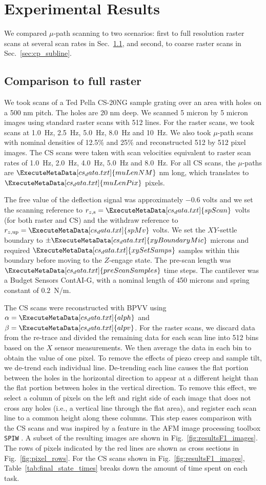 \documentclass[journal]{IEEEtran}
\newcommand{\xc}{\ensuremath{X}\xspace}
\newcommand{\rzup}{\ensuremath{r_{z,\textrm{up}}}\xspace}
\newcommand{\rzs}{\ensuremath{r_{z,\textrm{s}}}\xspace}
\newcommand{\scanD}[1]{\ExecuteMetaData[cs_data.txt]{#1}}
\begin{document}
\section{Experimental Results}\label{sec:results}
We compared $\mu$-path scanning to two scenarios: first to full resolution raster scans at several scan rates in
Sec.~\ref{sec:cp_full}, and second, to coarse raster scans in
Sec.~\ref{sec:cp_subline}.

\subsection{Comparison to full raster}\label{sec:cp_full}
We took scans of a Ted Pella CS-20NG sample grating over an area with
holes on a 500 nm pitch. The holes are 20 nm deep. We scanned 5 micron
by 5 micron images using standard raster scans with 512 lines. For the
raster scans, we took scans at 1.0~Hz, 2.5~Hz, 5.0~Hz, 8.0~Hz and
10~Hz. We also took $\mu$-path scans with nominal densities of 12.5\% and
25\% and reconstructed 512 by 512 pixel images. The CS scans were
taken with scan velocities equivalent to raster scan rates of 1.0~Hz,
2.0~Hz, 4.0~Hz, 5.0~Hz and 8.0~Hz. For all CS scans, the $\mu$-paths are
$\scanD{muLenNM}$ nm long, which translates to $\scanD{muLenPix}$
pixels.

The free value of the deflection signal was approximately $-0.6$ volts
and we set the scanning reference to ${\rzs=\scanD{spScan}}$~volts
(for both raster and CS) and the withdraw reference to
${\rzup=\scanD{spMv}}$ volts. We set the $XY$-settle boundary to
$\pm \scanD{xyBoundaryMic}$ microns and required $\scanD{xySetSamps}$
samples within this boundary before moving to the $Z$-engage state.
The pre-scan length was $\scanD{preScanSamples}$ time steps. The
cantilever was a Budget Sensors ContAI-G, with a nominal length of 450
microns and spring constant of $0.2$~N/m.

The CS scans were reconstructed with BPVV using
${\alpha=\scanD{alph}}$ and ${\beta=\scanD{alpv}}$. For the
raster scans, we discard data from the re-trace and divided the
remaining data for each scan line into 512 bins based on the \xc
sensor measurements. We then average the data in each bin to obtain
the value of one pixel. To remove the effects of piezo creep and
sample tilt, we de-trend each individual line. De-trending each
line causes the flat portion between the holes in the horizontal
direction to appear at a different height than the flat portion
between holes in the vertical direction. To remove this effect, we
select a column of pixels on the left and right side of each image
that does not cross any holes (i.e., a vertical line through the flat
area), and register each scan line to a common height along these columns.
This step eases comparison with the CS scans and was inspired by a
feature in the AFM image processing toolbox \texttt{SPIW} \cite{spiw}.
A subset of the resulting images are shown in Fig.~\ref{fig:resultsF1_images}. The
rows of pixels indicated by the red lines are shown as cross sections in
Fig.~\ref{fig:pixel_rows}. For the CS scans shown in Fig.~\ref{fig:resultsF1_images}, Table~\ref{tab:final_state_times} breaks down the amount of time spent on each task.
\end{document}
